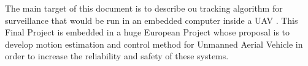 

The main target of this document is to describe ou tracking algorithm for surveillance that would be run in an embedded computer inside a UAV \cite{Image_processing_UAV}.  This Final Project is embedded in a huge European Project whose proposal is to develop motion estimation and control method for Unmanned Aerial Vehicle in order to increase the reliability and safety of these systems. \\


 
